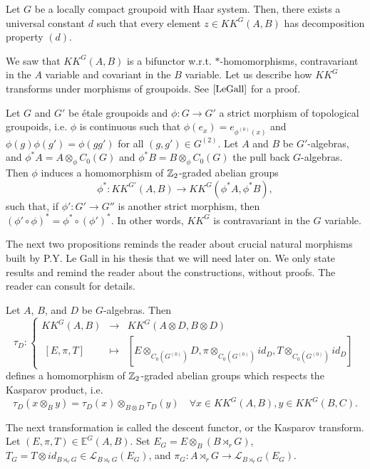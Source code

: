 \begin{thm}\label{propertyD}
Let $G$ be a locally compact groupoid with Haar system. Then, there exists a universal constant $d$ such that every element $z\in KK^G(A,B)$ has decomposition property $(d)$.
\end{thm}

We saw that $KK^G(A,B)$ is a bifunctor w.r.t. $*$-homomorphisms, contravariant in the $A$ variable and covariant in the $B$ variable. Let us describe how $KK^G$ transforms under morphisms of groupoids. See $\cite{LeGall}$ for a proof.

\begin{prop} Let $G$ and $G'$ be étale groupoids and $\phi :G\rightarrow G'$ a strict morphism of topological groupoids, i.e. $\phi$ is continuous such that $\phi(e_x)=e_{\phi^{(0)}(x)}$ and $\phi(g)\phi(g') = \phi(gg')$ for all $(g,g')\in G^{(2)}$. Let $A$ and $B$ be $G'$-algebras, and $\phi^* A = A\otimes_\phi C_0(G)$ and $\phi^* B = B\otimes_\phi C_0(G)$ the pull back $G$-algebras. Then $\phi$ induces a homomorphism of $\mathbb Z_2$-graded abelian groups
\[\phi^* : KK^{G'}(A,B)\rightarrow KK^G(\phi^* A,\phi^* B),\]
such that, if $\phi' : G'\rightarrow G''$ is another strict morphism, then $(\phi'\circ\phi)^* =\phi^*\circ(\phi')^*$. In other words, $KK^G$ is contravariant in the $G$ variable.
\end{prop}

The next two propositions reminds the reader about crucial natural morphisms built by P.Y. Le Gall in his thesis that we will need later on. We only state results and remind the reader about the constructions, without proofs. The reader can consult \cite{LeGall} for details.

\begin{prop}\cite{LeGall} Let $A$, $B$, and $D$ be $G$-algebras. Then 
\[\tau_D : 
\left\{\begin{array}{rcl} 
KK^G(A,B) & \rightarrow & KK^G(A\otimes D,B\otimes D) \\ 
\ [E,\pi,T] & \mapsto     & [E\otimes_{C_0(G^{(0)})} D,\pi\otimes_{C_0(G^{(0)})} id_D,T\otimes_{C_0(G^{(0)})} id_D]
\end{array}\right. \] 
defines a homomorphism of $\mathbb Z_2$-graded abelian groups which respects the Kasparov product, i.e. 
\[\tau_D(x\otimes_B y) = \tau_D(x)\otimes_{B\otimes D} \tau_D(y)\quad \forall x\in KK^G(A,B),y\in KK^G(B,C).\]
\end{prop}

The next transformation is called the descent functor, or the Kasparov transform. Let $(E,\pi,T)\in\mathbb E^G(A,B)$. Set $E_G = E\otimes_B (B\rtimes_r G)$, $T_G= T\otimes id_{B\rtimes_r G}\in \mathcal L_{B\rtimes_r G}(E_G)$, and $\pi_G: A\rtimes_r G \rightarrow \mathcal L_{B\rtimes_r G}(E_G)$. %

